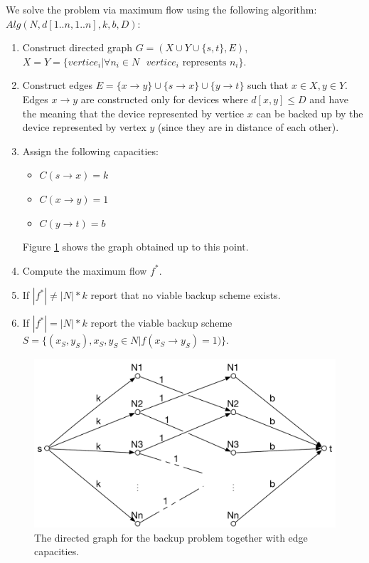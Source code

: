 We solve the problem via maximum flow using the following algorithm:
\\

$Alg(N, d[1..n, 1..n], k, b, D):$
\begin{enumerate}

	\item Construct directed graph $G=(X \cup Y \cup \{s, t\}, E)$, $ X=Y=\{ vertice_i | \forall{n_i \in N \text{ $vertice_i$ represents $n_i$}}\}$.
	
	\item Construct edges $E = \{ x \rightarrow y \} \cup \{ s \rightarrow x \} \cup \{ y \rightarrow t \}$ such that $x \in X, y \in Y$. Edges  $x \rightarrow y$ are constructed only for devices where $d[x, y] \leq D$ and have the meaning that the device represented by vertice $x$ can be backed up by the device represented by vertex $y$ (since they are in distance of each other).
	
	\item Assign the following capacities:
	\begin{itemize}
	
		\item $C(s \rightarrow x) = k$
		
		\item $C(x \rightarrow y) = 1$
		
		\item $C(y \rightarrow t) = b$
	
	\end{itemize}
	
	Figure \ref{fig:graph} shows the graph obtained up to this point.
	
	\item Compute the maximum flow $f^*$.
	
	\item If $|f^*| \neq |N| * k$ report that no viable backup scheme exists.
	
	\item If ${|f^*| = |N| * k}$ report the viable backup scheme ${S = \{ (x_S, y_S), x_S, y_S \in N | f(x_S \rightarrow y_S) = 1) \}}$.

\end{enumerate}

\begin{figure}[h!]
	\centering
		\includegraphics[width=\textwidth]{graph}
    
	\caption{The directed graph for the backup problem together with edge capacities.}
	\label{fig:graph}
\end{figure}

